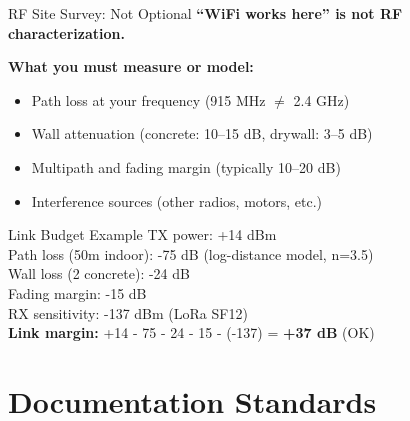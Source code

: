\documentclass[aspectratio=169,11pt]{beamer}
\begin{document}
\begin{frame}{RF Site Survey: Not Optional}
    \textbf{``WiFi works here'' is not RF characterization.}
    
    \vspace{0.3cm}
    \textbf{What you must measure or model:}
    \begin{itemize}
        \item Path loss at your frequency (915 MHz $\neq$ 2.4 GHz)
        \item Wall attenuation (concrete: 10--15 dB, drywall: 3--5 dB)
        \item Multipath and fading margin (typically 10--20 dB)
        \item Interference sources (other radios, motors, etc.)
    \end{itemize}
    
    \vspace{0.3cm}
    \begin{exampleblock}{Link Budget Example}
        TX power: +14 dBm\\
        Path loss (50m indoor): -75 dB (log-distance model, n=3.5)\\
        Wall loss (2 concrete): -24 dB\\
        Fading margin: -15 dB\\
        RX sensitivity: -137 dBm (LoRa SF12)\\
        \textbf{Link margin:} +14 - 75 - 24 - 15 - (-137) = \textbf{+37 dB} (OK)
    \end{exampleblock}
\end{frame}

\section{Documentation Standards}
\end{document}
